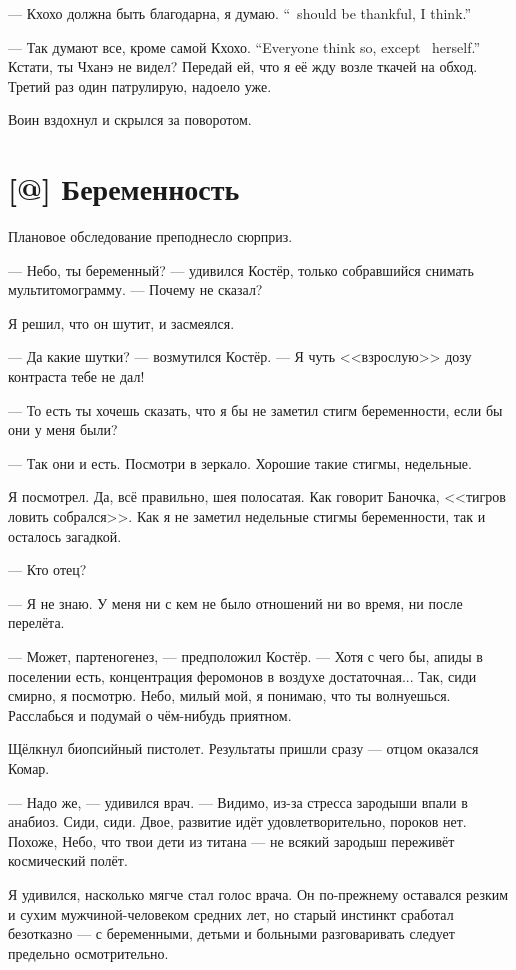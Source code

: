 {--- Кхохо должна быть благодарна, я думаю.}
{``\Kchoho\ should be thankful, I think.''}

{--- Так думают все, кроме самой Кхохо.}
{``Everyone think so, except \Kchoho\ herself.''}
Кстати, ты Чханэ не видел?
Передай ей, что я её жду возле ткачей на обход.
Третий раз один патрулирую, надоело уже.

Воин вздохнул и скрылся за поворотом.

\section{[@] Беременность}

Плановое обследование преподнесло сюрприз.

--- Небо, ты беременный? --- удивился Костёр, только собравшийся снимать мультитомограмму.
--- Почему не сказал?

Я решил, что он шутит, и засмеялся.

--- Да какие шутки? --- возмутился Костёр.
--- Я чуть <<взрослую>> дозу контраста тебе не дал!

--- То есть ты хочешь сказать, что я бы не заметил стигм беременности, если бы они у меня были?

--- Так они и есть.
Посмотри в зеркало.
Хорошие такие стигмы, недельные.

Я посмотрел.
Да, всё правильно, шея полосатая.
Как говорит Баночка, <<тигров ловить собрался>>.
Как я не заметил недельные стигмы беременности, так и осталось загадкой.

--- Кто отец?

--- Я не знаю.
У меня ни с кем не было отношений ни во время, ни после перелёта.

--- Может, партеногенез, --- предположил Костёр.
--- Хотя с чего бы, апиды в поселении есть, концентрация феромонов в воздухе достаточная...
Так, сиди смирно, я посмотрю.
Небо, милый мой, я понимаю, что ты волнуешься.
Расслабься и подумай о чём-нибудь приятном.

Щёлкнул биопсийный пистолет.
Результаты пришли сразу --- отцом оказался Комар.

--- Надо же, --- удивился врач.
--- Видимо, из-за стресса зародыши впали в анабиоз.
Сиди, сиди.
Двое, развитие идёт удовлетворительно, пороков нет.
Похоже, Небо, что твои дети из титана --- не всякий зародыш переживёт космический полёт.

Я удивился, насколько мягче стал голос врача.
Он по-прежнему оставался резким и сухим мужчиной-человеком средних лет, но старый инстинкт сработал безотказно --- с беременными, детьми и больными разговаривать следует предельно осмотрительно.

